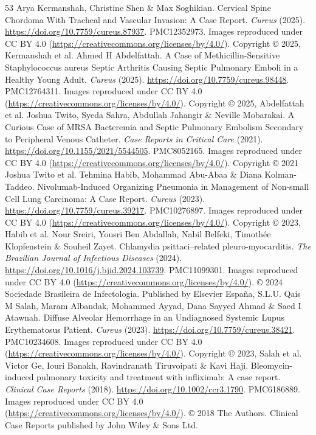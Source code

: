 \begin{thebibliography}{53}
 Arya Kermanshah, Christine Shen \& Max Soghikian. Cervical Spine Chordoma With Tracheal and Vascular Invasion: A Case Report. \textit{Cureus} (2025). \url{https://doi.org/10.7759/cureus.87937}. PMC12352973. Images reproduced under CC BY 4.0 (\url{https://creativecommons.org/licenses/by/4.0/}). Copyright © 2025, Kermanshah et al.
 Ahmed H Abdelfattah. A Case of Methicillin-Sensitive Staphylococcus aureus Septic Arthritis Causing Septic Pulmonary Emboli in a Healthy Young Adult. \textit{Cureus} (2025). \url{https://doi.org/10.7759/cureus.98448}. PMC12764311. Images reproduced under CC BY 4.0 (\url{https://creativecommons.org/licenses/by/4.0/}). Copyright © 2025, Abdelfattah et al.
 Joshua Twito, Syeda Sahra, Abdullah Jahangir \& Neville Mobarakai. A Curious Case of MRSA Bacteremia and Septic Pulmonary Embolism Secondary to Peripheral Venous Catheter. \textit{Case Reports in Critical Care} (2021). \url{https://doi.org/10.1155/2021/5544505}. PMC8052165. Images reproduced under CC BY 4.0 (\url{https://creativecommons.org/licenses/by/4.0/}). Copyright © 2021 Joshua Twito et al.
 Tehmina Habib, Mohammad Abu-Abaa \& Diana Kolman-Taddeo. Nivolumab-Induced Organizing Pneumonia in Management of Non-small Cell Lung Carcinoma: A Case Report. \textit{Cureus} (2023). \url{https://doi.org/10.7759/cureus.39217}. PMC10276897. Images reproduced under CC BY 4.0 (\url{https://creativecommons.org/licenses/by/4.0/}). Copyright © 2023, Habib et al.
 Nour Sreiri, Yousri Ben Abdallah, Nabil Belfeki, Timothée Klopfenstein \& Souheil Zayet. Chlamydia psittaci–related pleuro-myocarditis. \textit{The Brazilian Journal of Infectious Diseases} (2024). \url{https://doi.org/10.1016/j.bjid.2024.103739}. PMC11099301. Images reproduced under CC BY 4.0 (\url{https://creativecommons.org/licenses/by/4.0/}). © 2024 Sociedade Brasileira de Infectologia. Published by Elsevier España, S.L.U.
 Qais M Salah, Maram Albandak, Mohammed Ayyad, Dana Sayyed Ahmad \& Saed I Atawnah. Diffuse Alveolar Hemorrhage in an Undiagnosed Systemic Lupus Erythematosus Patient. \textit{Cureus} (2023). \url{https://doi.org/10.7759/cureus.38421}. PMC10234608. Images reproduced under CC BY 4.0 (\url{https://creativecommons.org/licenses/by/4.0/}). Copyright © 2023, Salah et al.
 Victor Ge, Iouri Banakh, Ravindranath Tiruvoipati \& Kavi Haji. Bleomycin-induced pulmonary toxicity and treatment with infliximab: A case report. \textit{Clinical Case Reports} (2018). \url{https://doi.org/10.1002/ccr3.1790}. PMC6186889. Images reproduced under CC BY 4.0 (\url{https://creativecommons.org/licenses/by/4.0/}). © 2018 The Authors. Clinical Case Reports published by John Wiley \& Sons Ltd.

\end{thebibliography}
